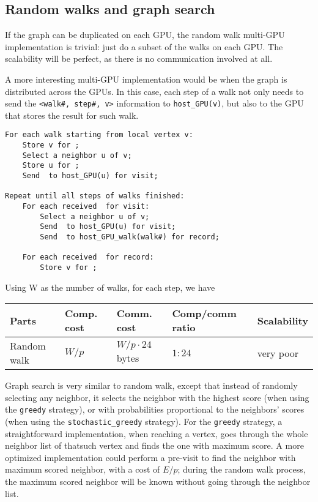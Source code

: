 \documentclass[10pt,oneside]{memoir}
\begin{document}
\hypertarget{random-walks-and-graph-search}{%
\subsection{Random walks and graph
search}\label{random-walks-and-graph-search}}

If the graph can be duplicated on each GPU, the random walk multi-GPU
implementation is trivial: just do a subset of the walks on each GPU.
The scalability will be perfect, as there is no communication involved
at all.

A more interesting multi-GPU implementation would be when the graph is
distributed across the GPUs. In this case, each step of a walk not only
needs to send the \texttt{\textless{}walk\#,\ step\#,\ v\textgreater{}}
information to \texttt{host\_GPU(v)}, but also to the GPU that stores
the result for such walk.

\begin{verbatim}
For each walk starting from local vertex v:
    Store v for ;
    Select a neighbor u of v;
    Store u for ;
    Send  to host_GPU(u) for visit;

Repeat until all steps of walks finished:
    For each received  for visit:
        Select a neighbor u of v;
        Send  to host_GPU(u) for visit;
        Send  to host_GPU_walk(walk#) for record;

    For each received  for record:
        Store v for ;
\end{verbatim}

Using W as the number of walks, for each step, we have

\begin{longtable}[]{@{}lllll@{}}
\toprule
Parts & Comp. cost & Comm. cost & Comp/comm ratio &
Scalability\tabularnewline
\midrule
\endhead
Random walk & \(W/p\) & \(W/p \cdot 24\) bytes & \(1 : 24\) & very
poor\tabularnewline
\bottomrule
\end{longtable}

Graph search is very similar to random walk, except that instead of
randomly selecting any neighbor, it selects the neighbor with the
highest score (when using the \texttt{greedy} strategy), or with
probabilities proportional to the neighbors' scores (when using the
\texttt{stochastic\_greedy} strategy). For the \texttt{greedy} strategy,
a straightforward implementation, when reaching a vertex, goes through
the whole neighbor list of thatsuch vertex and finds the one with
maximum score. A more optimized implementation could perform a pre-visit
to find the neighbor with maximum scored neighbor, with a cost of
\(E/p\); during the random walk process, the maximum scored neighbor
will be known without going through the neighbor list.
\end{document}
